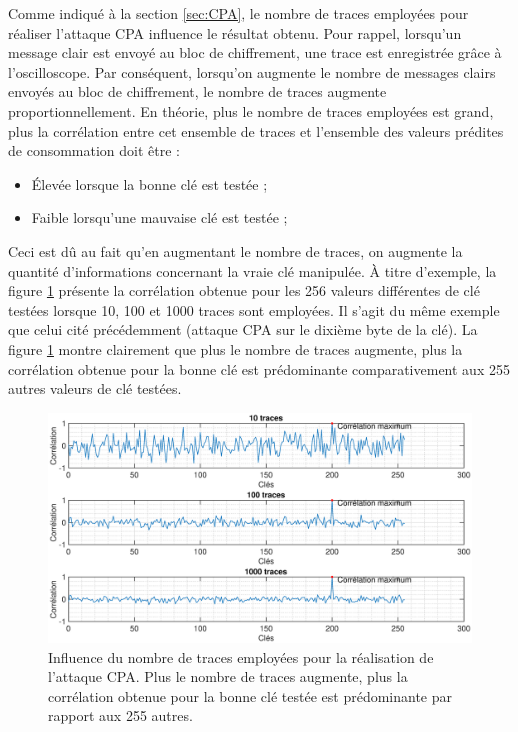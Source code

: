 \documentclass[oneside]{book}
\begin{document}
\newpage

Comme indiqué à la section \ref{sec:CPA}, le nombre de traces employées pour réaliser l'attaque CPA influence le résultat obtenu. Pour rappel, lorsqu'un message clair est envoyé au bloc de chiffrement, une trace est enregistrée grâce à l'oscilloscope. Par conséquent, lorsqu'on augmente le nombre de messages clairs envoyés au bloc de chiffrement, le nombre de traces augmente proportionnellement. En théorie, plus le nombre de traces employées est grand, plus la corrélation entre cet ensemble de traces et l'ensemble des valeurs prédites de consommation doit être :
\begin{itemize}
\item Élevée lorsque la bonne clé est testée ;
\item Faible lorsqu'une mauvaise clé est testée ;
\end{itemize}
Ceci est dû au fait qu'en augmentant le nombre de traces, on augmente la quantité d'informations concernant la vraie clé manipulée. À titre d'exemple, la figure \ref{fig:sim_nb_traces} présente la corrélation obtenue pour les 256 valeurs différentes de clé testées lorsque 10, 100 et 1000 traces sont employées. Il s'agit du même exemple que celui cité précédemment (attaque CPA sur le dixième byte de la clé). La figure \ref{fig:sim_nb_traces} montre clairement que plus le nombre de traces augmente, plus la corrélation obtenue pour la bonne clé est prédominante comparativement aux 255 autres valeurs de clé testées.

\begin{figure}[htbp]
    \hspace{-3.3cm}
    \includegraphics[scale=0.45]{image/sim_nb_traces}
    \caption{Influence du nombre de traces employées pour la réalisation de l'attaque CPA. Plus le nombre de traces augmente, plus la corrélation obtenue pour la bonne clé testée est prédominante par rapport aux 255 autres.}
    \label{fig:sim_nb_traces} 
\end{figure}
\end{document}
